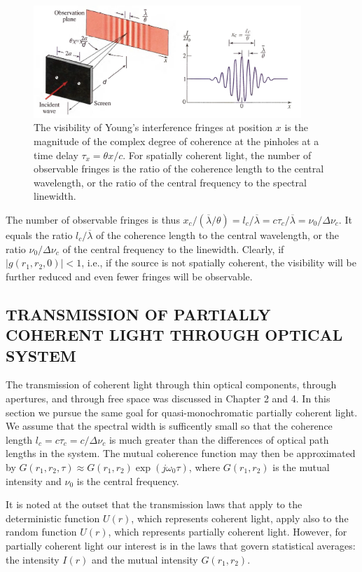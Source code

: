 \documentclass{article}
\numberwithin{figure}{subsection}
\numberwithin{table}{subsection}
\begin{document}
\begin{figure}[H]
\centering
\includegraphics[width=0.9\textwidth]{11_2_6.PNG}
\caption{The visibility of Young's interference fringes at position $x$ is the magnitude of the complex degree of coherence at the pinholes at a time delay $\tau_x = \theta x / c$. For spatially coherent light,  the number of observable fringes is the ratio of the coherence length to the central wavelength, or the ratio of the central frequency to the spectral linewidth.}
\label{fig: 11_2_6}
\end{figure}
\par The number of observable fringes is thus $x_c / (\overline{\lambda} / \theta) = l_c / \overline{\lambda} = c\tau_c / \overline{\lambda} = \nu_0 / \Delta \nu_c$. It equals the ratio $l_c / \overline{\lambda}$ of the coherence length to the central wavelength, or the ratio $\nu_0 / \Delta \nu_c$ of the central frequency to the linewidth. Clearly, if $\lvert g(r_1, r_2, 0) \rvert < 1$, i.e., if the source is not spatially coherent, the visibility will be further reduced and even fewer fringes will be observable.

\bigbreak\begingroup
\color{ksc}
\subsection{TRANSMISSION OF PARTIALLY COHERENT LIGHT THROUGH OPTICAL SYSTEM}
\endgroup
The transmission of coherent light through thin optical components, through apertures, and through free space was discussed in Chapter 2 and 4. In this section we pursue the same goal for quasi-monochromatic partially coherent light. We assume that the spectral width is sufficently small so that the coherence length $l_c = c\tau_c = c / \Delta \nu_c$ is much greater than the differences of optical path lengths in the system. The mutual coherence function may then be approximated by $G(r_1, r_2, \tau) \approx G(r_1, r_2) \exp(j\omega_0 \tau)$, where $G(r_1, r_2)$ is the mutual intensity and $\nu_0$ is the central frequency.
\par It is noted at the outset that the transmission laws that apply to the deterministic function $U(r)$, which represents coherent light, apply also to the random function $U(r)$, which represents partially coherent light. However, for partially coherent light our interest is in the laws that govern statistical averages: the intensity $I(r)$ and the mutual intensity $G(r_1, r_2)$.
\end{document}
